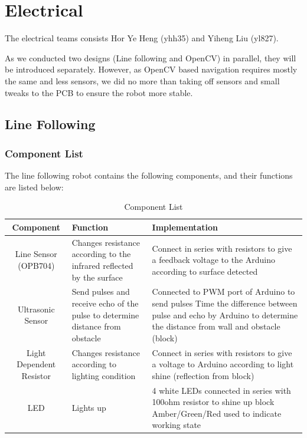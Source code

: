 \documentclass{article}
\begin{document}
\section{Electrical}
\quad The electrical teams consists Hor Ye Heng (yhh35) and Yiheng Liu (yl827). 

As we conducted two designs (Line following and OpenCV) in parallel, they will be introduced separately. However, as OpenCV based navigation requires mostly the same and less sensors, we did no more than taking off sensors and small tweaks to the PCB to ensure the robot more stable.
\subsection{Line Following}
\subsubsection{Component List}
The line following robot contains the following components, and their functions are listed below:
\begin{table}[]
    \centering
    \begin{tabular}{|c|p{5cm}|p{5cm}|}
\hline
Component &
  Function &
  Implementation
   \\
   \hline
Line Sensor (OPB704) &
  Changes resistance according to the infrared reflected by the surface &
  Connect in series with resistors to give a feedback voltage to the Arduino according to surface detected
   \\
   \hline
Ultrasonic Sensor &
  Send pulses and receive echo of the pulse to determine distance from obstacle &
Connected to PWM port of Arduino to send pulses  Time the difference between pulse and echo by Arduino to determine the distance from wall and obstacle (block)
   \\
   \hline
Light Dependent Resistor &
  Changes resistance according to lighting condition &
  Connect in series with resistors   to give a voltage to Arduino according to light shine (reflection from block) 
   \\
   \hline
LED &
  Lights up &
4 white LEDs connected in series with 100ohm resistor to shine up block Amber/Green/Red used to indicate   working state\\
  \hline
    \end{tabular}
    \caption{Component List}
    \label{tab:comp_list}
\end{table}
\end{document}
